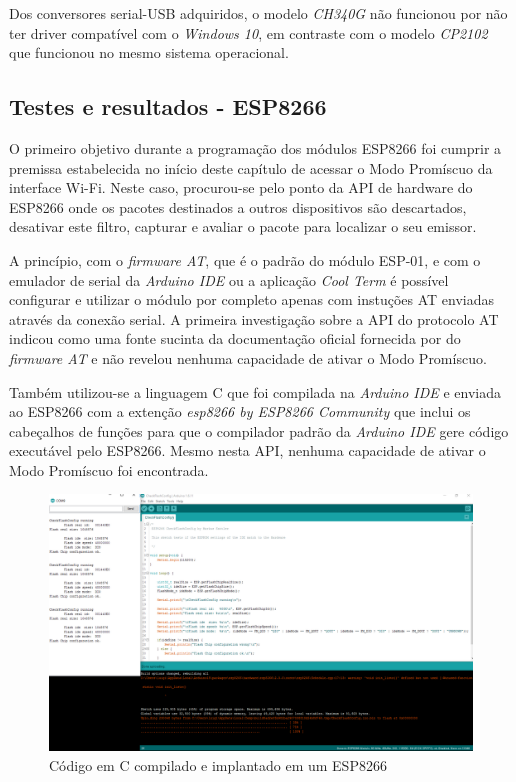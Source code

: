 Dos conversores serial-USB adquiridos, o modelo \emph{CH340G} não funcionou por
não ter driver compatível com o \emph{Windows 10}, em contraste com o modelo
\emph{CP2102}  que funcionou no mesmo sistema operacional.


\subsection{Testes e resultados - ESP8266}
\label{subsec:testes-esp}

O primeiro objetivo durante a programação dos módulos ESP8266 foi cumprir a
premissa  estabelecida no início deste capítulo de acessar o Modo Promíscuo da
interface Wi-Fi. Neste caso, procurou-se pelo ponto da API de
hardware do ESP8266 onde os pacotes destinados a outros dispositivos são
descartados, desativar este filtro, capturar e avaliar o pacote para localizar o
seu emissor.

A princípio, com o \emph{firmware AT}, que é o padrão do módulo ESP-01, e com o
emulador de serial da \emph{Arduino IDE} ou a aplicação \emph{Cool Term} é
possível configurar e utilizar o módulo por completo apenas com instuções AT
enviadas através da conexão serial. A primeira investigação sobre a API do protocolo
AT indicou  como uma fonte sucinta da documentação
oficial fornecida por  do \emph{firmware AT} e
não revelou nenhuma capacidade de ativar o Modo Promíscuo.

Também utilizou-se a linguagem C que foi compilada na \emph{Arduino IDE} e
enviada ao ESP8266 com a extenção \emph{esp8266 by ESP8266 Community} que inclui
os cabeçalhos de funções para que o compilador padrão da \emph{Arduino IDE} gere
código  executável pelo ESP8266. Mesmo nesta API, nenhuma capacidade de ativar o
Modo Promíscuo foi encontrada.

\begin{figure}[htb]
	\caption{\label{fig:esp-arduino}Código em C compilado e implantado em um ESP8266}
	\begin{center}
		\includegraphics[width=1\textwidth]{040-plataformas/esp-dev/arduino-ide.png}
	\end{center}
\end{figure}


